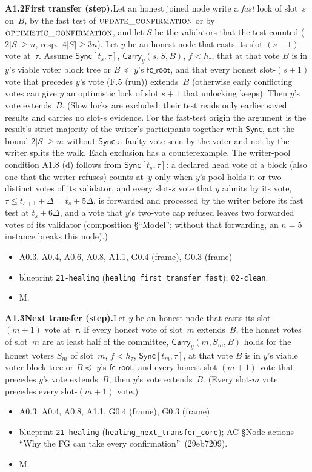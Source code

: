 \documentclass{article}
\newcommand{\fcroot}{\mathsf{fc\_root}}
\newcommand{\fname}[1]{\text{\textsc{#1}}}
\newcommand{\dagnode}[6]{%
\par\medskip\noindent\textbf{#1\enspace #2.}\enspace #3
\begin{itemize}[leftmargin=2.2em,itemsep=0pt,topsep=2pt]
\item[\emph{Uses}] #4
\item[\emph{Evid.}] #5
\item[\emph{Task}] #6
\end{itemize}}
\begin{document}
\dagnode{A1.2}{First transfer (step)}{Let an honest joined node write a
\emph{fast} lock of slot~$s$ on~$B$, by the fast test of
$\fname{update\_confirmation}$ or by $\fname{optimistic\_confirmation}$, and
let $S$ be the validators that the test counted ($2|S|\geq n$, resp.\
$4|S|\geq3n$).  Let $y$ be an honest node that casts its slot-$(s+1)$ vote
at~$\tau$.  Assume $\mathsf{Sync}[t_s,\tau]$, $\mathsf{Carry}_y(s,S,B)$,
$f<h_\tau$, that at that vote $B$ is in $y$'s viable voter block tree or
$B\preceq$ $y$'s $\fcroot$, and that every honest slot-$(s+1)$ vote that precedes
$y$'s vote (F.5 (run)) extends~$B$ (otherwise early conflicting votes can give $y$ an
optimistic lock of slot $s+1$ that unlocking keeps).  Then $y$'s vote
extends~$B$.  (Slow locks are excluded: their test reads only earlier saved
results and carries no slot-$s$ evidence.  For the fast-test origin the
argument is the result's strict majority of the writer's participants together
with $\mathsf{Sync}$, not the bound $2|S|\geq n$: without $\mathsf{Sync}$ a
faulty vote seen by the voter and not by the writer splits the walk.  Each
exclusion has a counterexample.  The writer-pool condition
A1.8 (d) follows from $\mathsf{Sync}[t_s,\tau]$: a declared head vote of a block
(also one that the writer refuses) counts at~$y$ only when $y$'s pool holds it or
two distinct votes of its validator, and every slot-$s$ vote that $y$
admits by its vote, $\tau\leq t_{s+1}+\Delta=t_s+5\Delta$, is forwarded and processed by the writer
before its fast test at $t_s+6\Delta$, and a vote that $y$'s two-vote cap
refused leaves two forwarded votes of its validator (composition
\S``Model''; without that forwarding, an $n=5$ instance
breaks this node).)}
{A0.3, A0.4, A0.6, A0.8, A1.1, G0.4 (frame), G0.3 (frame)}{blueprint \texttt{21-healing}
(\texttt{healing\_first\_transfer\_fast}); \texttt{02-clean}.}{M.}

\dagnode{A1.3}{Next transfer (step)}{Let $y$ be an honest node that casts its
slot-$(m+1)$ vote at~$\tau$.  If every honest vote of slot~$m$ extends~$B$, the
honest votes of slot~$m$ are at least half of the committee,
$\mathsf{Carry}_y(m,S_m,B)$ holds for the honest voters $S_m$ of slot~$m$,
$f<h_\tau$, $\mathsf{Sync}[t_m,\tau]$, at that vote $B$ is in $y$'s viable
voter block tree or $B\preceq$ $y$'s $\fcroot$, and every honest slot-$(m+1)$
vote that precedes $y$'s vote extends~$B$, then $y$'s vote extends~$B$.
(Every slot-$m$ vote precedes every slot-$(m+1)$ vote.)}
{A0.3, A0.4, A0.8, A1.1, G0.4 (frame), G0.3 (frame)}{blueprint \texttt{21-healing}
(\texttt{healing\_next\_transfer\_core}); AC \S Node actions ``Why the FG can
take every confirmation''~(29eb7209).}{M.}
\end{document}

